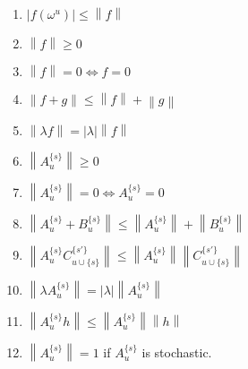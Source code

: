 \documentclass[a4paper,reqno]{amsart}
\newcommand{\asa}{\Leftrightarrow}
\newcommand{\norm}[1]{\left\lVert #1 \right\rVert}
\newcommand{\abs}[1]{\left\vert #1 \right\vert}
\newcommand{\coloneqq}{:\!=}
\begin{document}
\begin{enumerate}[label=N\arabic*:]
\item
$\abs{f(\omega^u)}\leq\norm{f}$
\item
$\norm{f}\geq0$
\item
$\norm{f}=0\asa f=0$
\item
$\norm{f+g}\leq\norm{f}+\norm{g}$
\item
$\norm{\lambda f}=\abs{\lambda}\norm{f}$
\item
$\norm{A_u^{\{s\}}}\geq0$
\item
$\norm{A_u^{\{s\}}}=0\asa A_u^{\{s\}}=0$
\item
$\norm{A_u^{\{s\}}+B_u^{\{s\}}}\leq\norm{A_u^{\{s\}}}+\norm{B_u^{\{s\}}}$
\item
$\norm{A_u^{\{s\}}C_{u\cup \{s\}}^{\{s'\}}}\leq\norm{A_u^{\{s\}}}\norm{C_{u\cup \{s\}}^{\{s'\}}}$
\item
$\norm{\lambda A_u^{\{s\}}}=\abs{\lambda}\norm{A_u^{\{s\}}}$
\item
$\norm{A_u^{\{s\}}h}\leq\norm{A_u^{\{s\}}}\norm{h}$
\item
$\norm{A_u^{\{s\}}}=1$ if $A_u^{\{s\}}$ is stochastic.
\end{enumerate}
\vspace{5pt}

\end{document}
